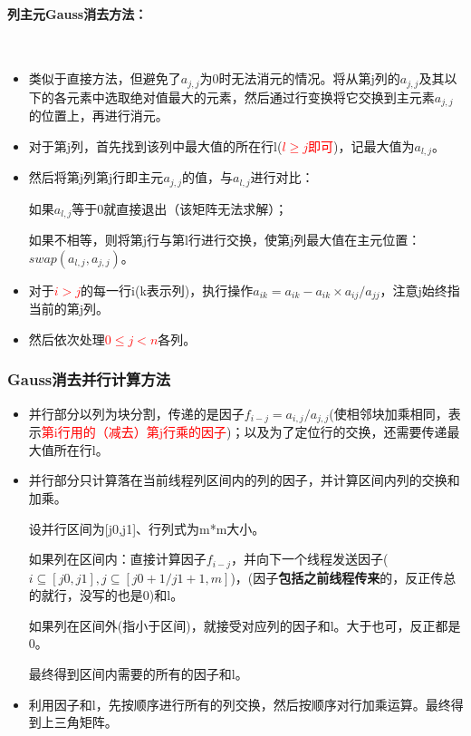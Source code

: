 \documentclass[UTF8]{article}%
\begin{document}
\paragraph{列主元Gauss消去方法：}~{}

\begin{itemize}
    \item 类似于直接方法，但避免了$a_{j,j}$为0时无法消元的情况。将从第j列的$a_{j,j}$及其以下的各元素中选取绝对值最大的元素，然后通过行变换将它交换到主元素$a_{j,j}$的位置上，再进行消元。
    \item 对于第j列，首先找到该列中最大值的所在行l(\textcolor{red}{$l\geq j$即可})，记最大值为$a_{l,j}$。
    \item 然后将第j列第j行即主元$a_{j,j}$的值，与$a_{l,j}$进行对比：
    
    如果$a_{l,j}$等于0就直接退出（该矩阵无法求解）；
    
    如果不相等，则将第j行与第l行进行交换，使第j列最大值在主元位置： $swap(a_{l,j},a_{j,j})$。

    \item 对于\textcolor{red}{$i>j$}的每一行i(k表示列)，执行操作$a_{ik}=a_{ik}-a_{ik}\times a_{ij}/a_{jj}$，注意j始终指当前的第j列。
    \item 然后依次处理\textcolor{red}{$0\leq j < n$}各列。
\end{itemize}

\subsubsection{Gauss消去并行计算方法}

\begin{itemize}
    \item 并行部分以列为块分割，传递的是因子$f_{i-j}=a_{i,j}/a_{j,j}$(使相邻块加乘相同，表示\textcolor{red}{第i行用的（减去）第j行乘的因子})；以及为了定位行的交换，还需要传递最大值所在行l。
    \item 并行部分只计算落在当前线程列区间内的列的因子，并计算区间内列的交换和加乘。
    
    设并行区间为[j0,j1]、行列式为m*m大小。
    
    如果列在区间内：直接计算因子$f_{i-j}$，并向下一个线程发送因子($i\subseteq [j0,j1],j\subseteq [j0+1/j1+1,m]$)，(因子\textbf{包括之前线程传来}的，反正传总的就行，没写的也是0)和l。
    
    如果列在区间外(指小于区间)，就接受对应列的因子和l。大于也可，反正都是0。

    最终得到区间内需要的所有的因子和l。

    \item 利用因子和l，先按顺序进行所有的列交换，然后按顺序对行加乘运算。最终得到上三角矩阵。
\end{itemize}
\end{document}
